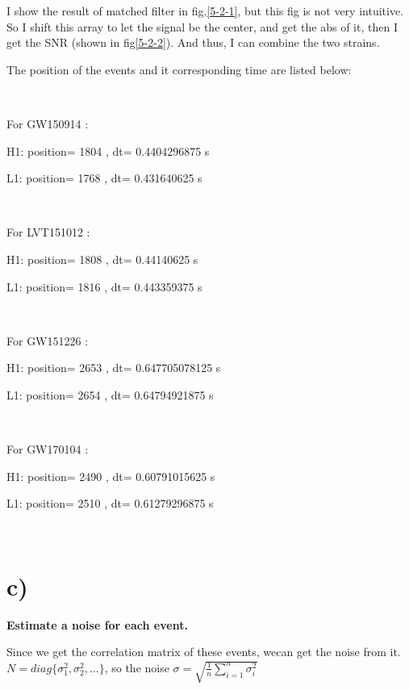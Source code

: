 \documentclass[showpacs, oneside, onecolumn, prl, amsmath, amssymb, nofootinbib, superscriptaddress, notitlepage]{revtex4-1}
\begin{document}
I show the result of matched filter in fig.\ref{5-2-1}, but this fig is not very intuitive. So I shift this array to let the signal be the center, and get the abs of it, then I get the SNR (shown in fig\ref{5-2-2}). And thus, I can combine the two strains.

The position of the events and it corresponding time are listed below:

{\color{gray}
~~~~

For  GW150914 :

H1: position= 1804 , dt= 0.4404296875 s

L1: position= 1768 , dt= 0.431640625 s

~~~~

For  LVT151012 :

H1: position= 1808 , dt= 0.44140625 s

L1: position= 1816 , dt= 0.443359375 s

~~~~

For  GW151226 :

H1: position= 2653 , dt= 0.647705078125 s

L1: position= 2654 , dt= 0.64794921875 s

~~~~

For  GW170104 :

H1: position= 2490 , dt= 0.60791015625 s

L1: position= 2510 , dt= 0.61279296875 s

~~~~
}

\section{c)}

\textbf{Estimate a noise for each event.}

Since we get the correlation matrix of these events, wecan get the noise from it. $N=diag\{\sigma_1^2,\sigma_2^2,\dots\}$, so the noise $\sigma=\sqrt{\frac1n\sum_{i=1}^n \sigma_i^2}$
\end{document}
